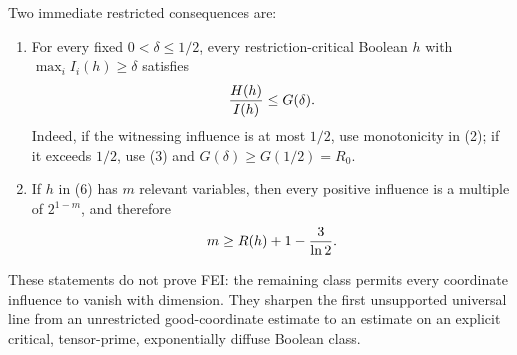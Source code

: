 Two immediate restricted consequences are:

\begin{enumerate}
\item For every fixed \(0<\delta\le1/2\), every restriction-critical
Boolean \(h\) with \(\max_i I_i(h)\ge\delta\) satisfies
\[
 {H(h)\over I(h)}\le G(\delta).
\]
Indeed, if the witnessing influence is at most \(1/2\), use monotonicity in
(2); if it exceeds \(1/2\), use (3) and \(G(\delta)\ge G(1/2)=R_0\).

\item If \(h\) in (6) has \(m\) relevant variables, then every positive
influence is a multiple of \(2^{1-m}\), and therefore
\[
 m\ge R(h)+1-{3\over\ln2}.
\]
\end{enumerate}

These statements do not prove FEI: the remaining class permits every
coordinate influence to vanish with dimension.  They sharpen the first
unsupported universal line from an unrestricted good-coordinate estimate to
an estimate on an explicit critical, tensor-prime, exponentially diffuse
Boolean class.
